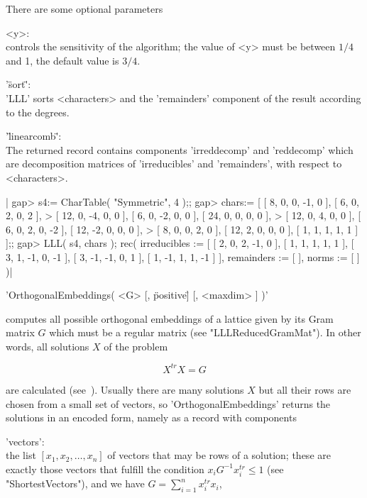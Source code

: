 There are some optional parameters\:

<y>:\\ controls the sensitivity of the algorithm;  the value of  <y> must
       be between $1/4$ and 1, the default value is $3/4$.

'\"sort\"':\\
       'LLL' sorts  <characters>  and the  'remainders'  component of the
       result according to the degrees.

'\"linearcomb\"':\\ The returned record contains components 'irreddecomp'
       and 'reddecomp' which are decomposition matrices of 'irreducibles'
       and 'remainders', with respect to <characters>.

|    gap> s4:= CharTable( "Symmetric", 4 );;
    gap> chars:= [ [ 8, 0, 0, -1, 0 ], [ 6, 0, 2, 0, 2 ],
    >     [ 12, 0, -4, 0, 0 ], [ 6, 0, -2, 0, 0 ], [ 24, 0, 0, 0, 0 ],
    >     [ 12, 0, 4, 0, 0 ], [ 6, 0, 2, 0, -2 ], [ 12, -2, 0, 0, 0 ],
    >     [ 8, 0, 0, 2, 0 ], [ 12, 2, 0, 0, 0 ], [ 1, 1, 1, 1, 1 ] ];;
    gap> LLL( s4, chars );
    rec(
      irreducibles :=
       [ [ 2, 0, 2, -1, 0 ], [ 1, 1, 1, 1, 1 ], [ 3, 1, -1, 0, -1 ],
          [ 3, -1, -1, 0, 1 ], [ 1, -1, 1, 1, -1 ] ],
      remainders := [  ],
      norms := [  ] )|

%

'OrthogonalEmbeddings( <G> [, \"positive\" ] [, <maxdim> ] )'

computes  all possible orthogonal  embeddings  of a lattice  given by its
Gram matrix $G$ which must be a regular matrix (see "LLLReducedGramMat").
In other words, all solutions $X$ of the problem

\[ X^{tr} X = G \]

are calculated (see~\cite{Ple90}).  Usually  there are many solutions $X$
but  all  their  rows  are   chosen from a   small   set of  vectors,  so
'OrthogonalEmbeddings' returns the solutions  in an encoded  form, namely
as a record with components

'vectors':\\ the list $[ x_1, x_2, \ldots, x_n ]$ of vectors that may
             be rows of a solution; these are exactly those vectors
             that fulfill the condition $x_i G^{-1} x_{i}^{tr} \leq 1$
             (see "ShortestVectors"), and we have
             $G = \sum^n_{i=1} x_i^{tr} x_i$,


